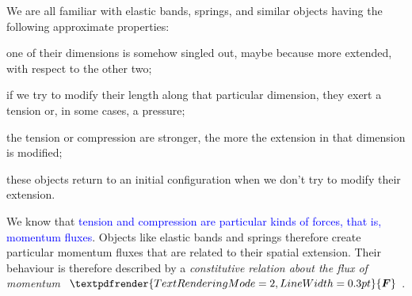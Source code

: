 \documentclass[a4paper,12pt,%
onecolumn,oneside,titlepage,%
british%
]{memoir}
\renewcommand*{\bm}[1]{\textpdfrender{TextRenderingMode=2,LineWidth=0.3pt}{\boldsymbol{#1}}}
\renewcommand*{\|}[1][]{\nonscript\:#1\vert\nonscript\:\mathopen{}}
\newcommand*{\sect}{\S}%
\renewcommand*{\autoref}[2]{\sidepar{\vspace{-1ex}\footnotesize{\color{blue}\faIcon{%
angle-right%
}\enspace\sect\,\ref{#1} page\,\pageref{#1}}}\textcolor{blue}{#2}}
\newcommand*{\yF}{\bm{F}}
\begin{document}
%
We are all familiar with elastic bands, springs, and similar objects having the following approximate properties:
\begin{enumerate*}[label=(\alph*)]
\item one of their dimensions is somehow singled out, maybe because more extended, with respect to the other two;
\item if we try to modify their length along that particular dimension, they exert a tension or, in some cases, a pressure;
\item the tension or compression are stronger, the more the extension in that dimension is modified;
\item these objects return to an initial configuration when we don't try to modify their extension.
\end{enumerate*}

We know that \autoref{sec:pressure_tension_shear}{tension and compression are particular kinds of forces, that is, momentum fluxes}. Objects like elastic bands and springs therefore create particular momentum fluxes that are related to their spatial extension. Their behaviour is therefore described by a \emph{constitutive relation about the flux of momentum $\yF$}.
\end{document}
